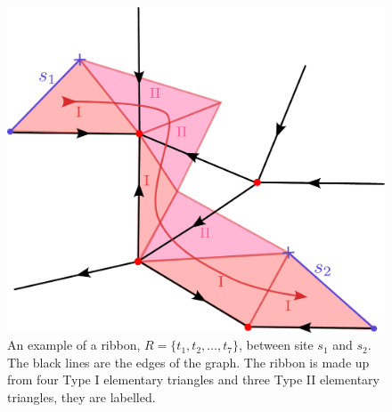 \documentclass[a4paper,twocolumn,11pt]{quantumarticle}
\begin{document}
\begin{figure}
    \centering
    \includegraphics[width= \linewidth]{Figures/ribbon_exampl.pdf}
    \caption{An example of a ribbon, $R = \{t_1, t_2, \ldots, t_7\}$, between site $s_1$ and $s_2$. The black lines are the edges of the graph. The ribbon is made up from four Type I elementary triangles and three Type II elementary triangles, they are labelled.}
    \label{fig:rib_exampl}
\end{figure}
\end{document}
